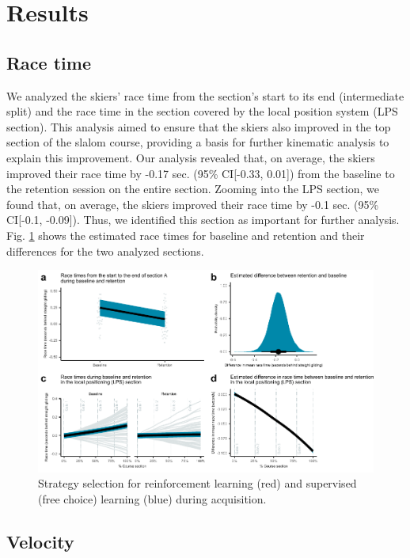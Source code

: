 \documentclass{article}
\begin{document}
\section{Results}



\subsection{Race time}
We analyzed the skiers' race time from the section's start to its end (intermediate split) and the race time in the section covered by the local position system (LPS section). This analysis aimed to ensure that the skiers also improved in the top section of the slalom course, providing a basis for further kinematic analysis to explain this improvement. Our analysis revealed that, on average, the skiers improved their race time by -0.17 sec. (95\% CI[-0.33, 0.01]) from the baseline to the retention session on the entire section. Zooming into the LPS section, we found that, on average, the skiers improved their race time by -0.1 sec. (95\% CI[-0.1, -0.09]). Thus, we identified this section as important for further analysis. Fig. \ref{fig: choice_estimated} shows the estimated race times for baseline and retention and their differences for the two analyzed sections. 

\begin{figure}[H]
\centering
\includegraphics{figurer/figure_racetime_2.pdf}
\caption{Strategy selection for reinforcement learning (red) and supervised (free choice) learning (blue) during acquisition.}\label{fig: choice_estimated}
\end{figure}

\subsection{Velocity}
\end{document}
